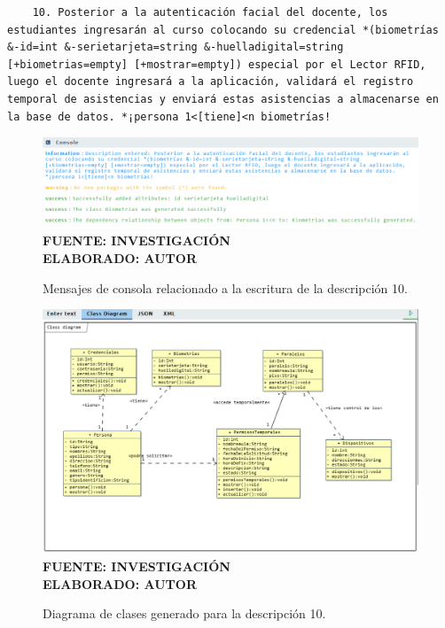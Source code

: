 \begin{lstlisting}
	10. Posterior a la autenticación facial del docente, los estudiantes ingresarán al curso colocando su credencial *(biometrías &-id=int &-serietarjeta=string &-huelladigital=string [+biometrias=empty] [+mostrar=empty]) especial por el Lector RFID, luego el docente ingresará a la aplicación, validará el registro temporal de asistencias y enviará estas asistencias a almacenarse en la base de datos. *¡persona 1<[tiene]<n biometrías!
\end{lstlisting}

     \begin{figure}[h!]
     	\centering
	\caption{Mensajes de consola relacionado a la escritura de la descripción 10.}
	\includegraphics[width=14cm]{img/not-eva-010.png}
	\label{fig:not_eva_010}
	\vspace{4mm}
	{\footnotesize \textbf{\\ FUENTE: INVESTIGACIÓN} \textbf{\\ ELABORADO: AUTOR}}
\end{figure}

\begin{figure}[H]
	\centering
	\caption{Diagrama de clases generado para la descripción 10.}
	\includegraphics[width=15cm]{img/dc-eva-010.png}
	\label{fig:dc_eva_010}
	\vspace{4mm}
	{\footnotesize \textbf{\\ FUENTE: INVESTIGACIÓN} \textbf{\\ ELABORADO: AUTOR}}
\end{figure}

